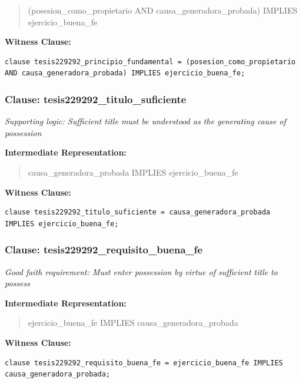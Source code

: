 \documentclass[11pt,a4paper]{article}
\begin{document}
\begin{quote}
(posesion\_como\_propietario AND causa\_generadora\_probada) IMPLIES ejercicio\_buena\_fe
\end{quote}

\textbf{Witness Clause:}

\begin{lstlisting}[style=witnessstyle, language=Witness]
clause tesis229292_principio_fundamental = (posesion_como_propietario AND causa_generadora_probada) IMPLIES ejercicio_buena_fe;
\end{lstlisting}

\subsubsection{Clause: tesis229292\_titulo\_suficiente}

\textit{Supporting logic: Sufficient title must be understood as the generating cause of possession}

\textbf{Intermediate Representation:}

\begin{quote}
causa\_generadora\_probada IMPLIES ejercicio\_buena\_fe
\end{quote}

\textbf{Witness Clause:}

\begin{lstlisting}[style=witnessstyle, language=Witness]
clause tesis229292_titulo_suficiente = causa_generadora_probada IMPLIES ejercicio_buena_fe;
\end{lstlisting}

\subsubsection{Clause: tesis229292\_requisito\_buena\_fe}

\textit{Good faith requirement: Must enter possession by virtue of sufficient title to possess}

\textbf{Intermediate Representation:}

\begin{quote}
ejercicio\_buena\_fe IMPLIES causa\_generadora\_probada
\end{quote}

\textbf{Witness Clause:}

\begin{lstlisting}[style=witnessstyle, language=Witness]
clause tesis229292_requisito_buena_fe = ejercicio_buena_fe IMPLIES causa_generadora_probada;
\end{lstlisting}
\end{document}
